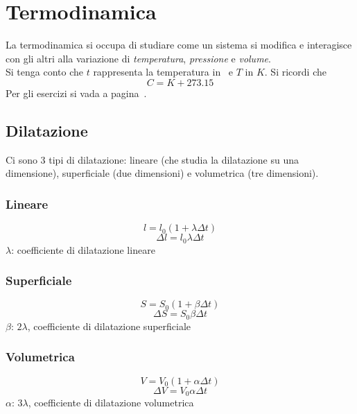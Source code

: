 
\section{Termodinamica}\label{sec:termodinamica}
La termodinamica si occupa di studiare come un sistema si modifica e interagisce con gli altri
alla variazione di \emph{temperatura}, \emph{pressione} e \emph{volume}.\\
Si tenga conto che $t$ rappresenta la temperatura in \textcelsius\ e $T$ in $K$. Si ricordi che
\begin{equation*}
C = K + 273.15
\end{equation*}
Per gli esercizi si vada a pagina~\pageref{ex:termodinamica}.

\subsection{Dilatazione}
Ci sono 3 tipi di dilatazione: lineare (che studia la dilatazione su una dimensione), superficiale 
(due dimensioni) e volumetrica (tre dimensioni).

\subsubsection{Lineare}
\begin{equation*}
l = l_0\left(1+\lambda\Delta t\right)
\end{equation*}
\begin{equation*}
\Delta l = l_0\lambda\Delta t
\end{equation*}
$\lambda$: coefficiente di dilatazione lineare

\subsubsection{Superficiale}
\begin{equation*}
S = S_0\left(1+\beta\Delta t\right)
\end{equation*}
\begin{equation*}
\Delta S = S_0\beta\Delta t
\end{equation*}
$\beta$: $2\lambda$, coefficiente di dilatazione superficiale 

\subsubsection{Volumetrica}
\begin{equation*}
V = V_0\left(1+\alpha\Delta t\right)
\end{equation*}
\begin{equation*}
\Delta V = V_0\alpha\Delta t
\end{equation*}
$\alpha$: $3\lambda$, coefficiente di dilatazione volumetrica\\

